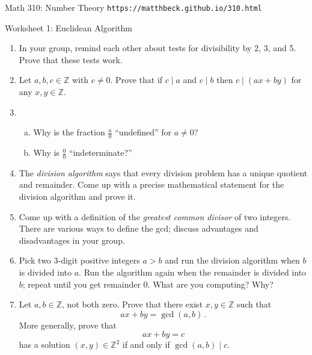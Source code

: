 \documentclass[11pt]{article}
\def\Z{\mathbb{Z}}
\begin{document}
\setlength{\parindent}{0pt}
\setlength{\parskip}{0.2cm}

$\mbox{}$
\vspace{-1in}

{ Math 310: Number Theory}
\hfill
{\tt https://matthbeck.github.io/310.html}

\vspace{.3in}

\begin{center}
\Large{Worksheet 1: Euclidean Algorithm}
\end{center}

\begin{enumerate}

\item In your group, remind each other about tests for divisibility by 2, 3, and 5.
Prove that these tests work.

\item Let $a, b, c \in \Z$ with $c \ne 0$.
Prove that if $c \mid a$ and $c \mid b$ then $c \mid (ax+by)$ for any $x, y \in \Z$. 

\item 
\begin{enumerate}[(a)]
  \item Why is the fraction $\frac{a}{0}$ ``undefined'' for $a \ne 0$?
  \item Why is $\frac{0}{0}$ ``indeterminate?''
\end{enumerate}

\item The \emph{division algorithm} says that every division problem has a unique quotient and remainder.
Come up with a precise mathematical statement for the division algorithm and prove it.

\item Come up with a definition of the \emph{greatest common divisor} of two integers.
There are various ways to define the gcd; discuss advantages and disadvantages in your group.

\item Pick two 3-digit positive integers $a > b$ and run the division algorithm when $b$ is divided into $a$.
Run the algorithm again when the remainder is divided into $b$; repeat until you get remainder 0.
What are you computing? Why?

\item Let $a, b \in \Z$, not both zero.
Prove that there exist $x, y \in \Z$ such that
\[
  ax+by = \gcd(a,b) \, .
\]
More generally, prove that
\[
  ax+by = c
\]
has a solution $(x,y) \in \Z^2$ if and only if $\gcd(a,b) \mid c$.


\end{enumerate}
\end{document}
